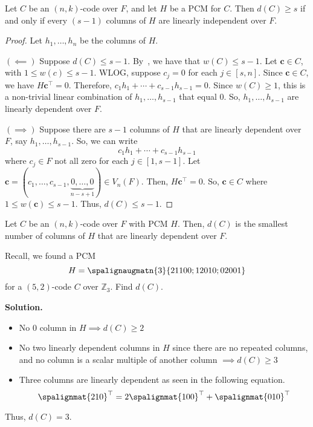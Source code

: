 
\begin{Theorem}{}{}
    Let $ C $ be an $ (n,k) $-code over $ F $, and let $ H $ be a PCM
    for $ C $. Then $ d(C)\geqslant s $ if and only if every $ (s-1) $ columns
    of $ H $ are linearly independent over $ F $.
\end{Theorem}

\begin{proof}
    Let $ h_1,\ldots ,h_n $ be the columns of $ H $.

    $ (\impliedby) $ Suppose $ d(C)\leqslant s-1 $. By~,
    we have that $ w(C)\leqslant s-1 $.
    Let $ \bm{c}\in C $, with $ 1\leqslant w(c)\leqslant s-1 $. WLOG, suppose
    $ c_j=0 $ for each $ j\in[s,n] $. Since $ \bm{c}\in C $,
    we have $ H\bm{c}^{\top}=0 $. Therefore,
    $ c_1h_1+\cdots+c_{s-1}h_{s-1}=0 $.
    Since $ w(C)\geqslant 1 $, this is a non-trivial linear combination
    of $ h_1,\ldots ,h_{s-1} $ that equal $ 0 $. So,
    $ h_1,\ldots ,h_{s-1} $ are linearly dependent over $ F $.

    $ (\implies) $ Suppose there are $ s-1 $ columns of $ H $ that
    are linearly dependent over $ F $, say $ h_1,\ldots ,h_{s-1} $. So,
    we can write
    \[ c_1h_1+\cdots+c_{s-1}h_{s-1} \]
    where $ c_j\in F $ not all zero for each $ j\in[1,s-1] $.
    Let $ \bm{c}=(c_1,\ldots ,c_{s-1},
        \underbrace{0,\ldots,0}_{n-s+1})\in V_n(F) $. Then,
    $ H\bm{c}^{\top}=0 $. So, $ \bm{c}\in C $ where $ 1\leqslant w(\bm{c})\leqslant s-1 $.
    Thus, $ d(C)\leqslant s-1 $.
\end{proof}

\begin{Corollary}{}{}
    Let $ C $ be an $ (n,k) $-code over $ F $ with PCM $ H $. Then,
    $ d(C) $ is the smallest number of columns of $ H $ that
    are linearly dependent over $ F $.
\end{Corollary}

\begin{Example}{}{}
    Recall, we found a PCM
    \[ H=\spalignaugmatn{3}{
            2 1 1 0 0;
            1 2 0 1 0;
            0 2 0 0 1} \]
    for a $ (5,2) $-code $ C $ over $ \mathbb{Z}_3 $. Find $ d(C) $.

    \textbf{Solution.}
    \begin{itemize}
        \item No $ 0 $ column in $ H\implies d(C)\geqslant 2 $
        \item No two linearly dependent columns in $ H $ since there are
              no repeated columns, and no column is a scalar multiple of another
              column $ \implies d(C)\geqslant 3 $
        \item Three columns are linearly dependent as seen in the following equation.
              \[ \spalignmat{2 1 0}^\top=2\spalignmat{1 0 0}^\top+\spalignmat{0 1 0}^\top \]
    \end{itemize}
    Thus, $ d(C)=3 $.
\end{Example}

